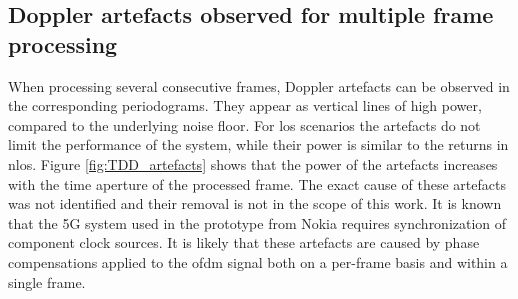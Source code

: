 	\subsection{Doppler artefacts observed for multiple frame processing}

		When processing several consecutive frames, Doppler artefacts can be observed in the corresponding periodograms.
		They appear as vertical lines of high power, compared to the underlying noise floor.
		For \gls{los} scenarios the artefacts do not limit the performance of the system, while their power is similar to the returns in \gls{nlos}.
		Figure \ref{fig:TDD_artefacts} shows that the power of the artefacts increases with the time aperture of the processed frame.
		The exact cause of these artefacts was not identified and their removal is not in the scope of this work. It is known that the 5G system used in the prototype from Nokia requires synchronization of component clock sources.
		It is likely that these artefacts are caused by phase compensations applied to the \gls{ofdm} signal both on a per-frame basis and within a single frame.
